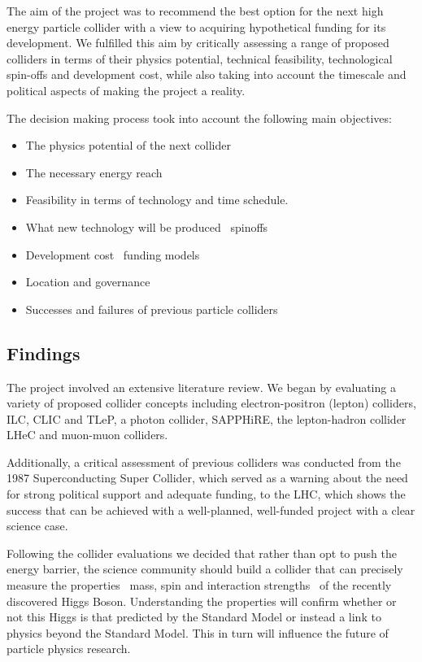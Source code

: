 The aim of the project was to recommend the best option for the next high energy particle collider with a view to acquiring hypothetical funding for its development. We fulfilled this aim by critically assessing a range of proposed colliders in terms of their physics potential, technical feasibility, technological spin-offs and development cost, while also taking into account the timescale and political aspects of making the project a reality.

The decision making process took into account the following main objectives:

\begin{itemize}
	\item The physics potential of the next collider
    \item The necessary energy reach
    \item Feasibility in terms of technology and time schedule.
    \item What new technology will be produced \textemdash \, spin\textendash offs
    \item Development cost \textemdash \, funding models
    \item Location and governance
    \item Successes and failures of previous particle colliders
\end{itemize}

\subsection{Findings}

The project involved an extensive literature review. We began by evaluating a variety of proposed collider concepts including electron-positron (lepton) colliders, ILC, CLIC and TLeP, a photon collider, SAPPHiRE, the lepton-hadron collider LHeC and muon-muon colliders.

Additionally, a critical assessment of previous colliders was conducted from the 1987 Superconducting Super Collider, which served as a warning about the need for strong political support and adequate funding, to the LHC, which shows the success that can be achieved with a well-planned, well-funded project with a clear science case.

Following the collider evaluations we decided that rather than opt to push the energy barrier, the science community should build a collider that can precisely measure the properties \textemdash \, mass, spin and interaction strengths \textemdash \, of the recently discovered Higgs Boson. Understanding the properties will confirm whether or not this Higgs is that predicted by the Standard Model or instead a link to physics beyond the Standard Model. This in turn will influence the future of particle physics research.

